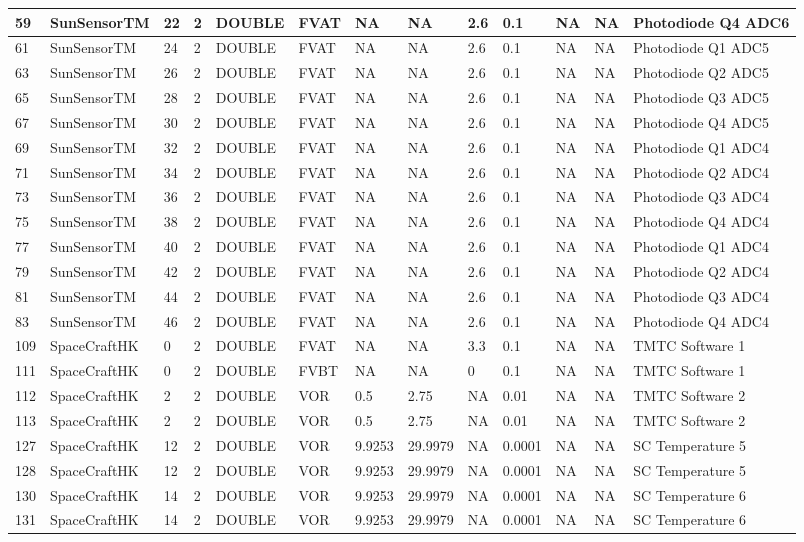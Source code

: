 {\begin{longtable}{|l|l|l|l|l|l|l|l|l|l|l|l|p{}|}
59 & SunSensorTM & 22 & 2 & DOUBLE & FVAT & NA & NA & 2.6 & 0.1 & NA & NA & Photodiode Q4 ADC6 \\ \hline
61 & SunSensorTM & 24 & 2 & DOUBLE & FVAT & NA & NA & 2.6 & 0.1 & NA & NA & Photodiode Q1 ADC5 \\ \hline
63 & SunSensorTM & 26 & 2 & DOUBLE & FVAT & NA & NA & 2.6 & 0.1 & NA & NA & Photodiode Q2 ADC5 \\ \hline
65 & SunSensorTM & 28 & 2 & DOUBLE & FVAT & NA & NA & 2.6 & 0.1 & NA & NA & Photodiode Q3 ADC5 \\ \hline
67 & SunSensorTM & 30 & 2 & DOUBLE & FVAT & NA & NA & 2.6 & 0.1 & NA & NA & Photodiode Q4 ADC5 \\ \hline
69 & SunSensorTM & 32 & 2 & DOUBLE & FVAT & NA & NA & 2.6 & 0.1 & NA & NA & Photodiode Q1 ADC4 \\ \hline
71 & SunSensorTM & 34 & 2 & DOUBLE & FVAT & NA & NA & 2.6 & 0.1 & NA & NA & Photodiode Q2 ADC4 \\ \hline
73 & SunSensorTM & 36 & 2 & DOUBLE & FVAT & NA & NA & 2.6 & 0.1 & NA & NA & Photodiode Q3 ADC4 \\ \hline
75 & SunSensorTM & 38 & 2 & DOUBLE & FVAT & NA & NA & 2.6 & 0.1 & NA & NA & Photodiode Q4 ADC4 \\ \hline
77 & SunSensorTM & 40 & 2 & DOUBLE & FVAT & NA & NA & 2.6 & 0.1 & NA & NA & Photodiode Q1 ADC4 \\ \hline
79 & SunSensorTM & 42 & 2 & DOUBLE & FVAT & NA & NA & 2.6 & 0.1 & NA & NA & Photodiode Q2 ADC4 \\ \hline
81 & SunSensorTM & 44 & 2 & DOUBLE & FVAT & NA & NA & 2.6 & 0.1 & NA & NA & Photodiode Q3 ADC4 \\ \hline
83 & SunSensorTM & 46 & 2 & DOUBLE & FVAT & NA & NA & 2.6 & 0.1 & NA & NA & Photodiode Q4 ADC4 \\ \hline
109 & SpaceCraftHK & 0 & 2 & DOUBLE & FVAT & NA & NA & 3.3 & 0.1 & NA & NA & TMTC Software 1 \\ \hline
111 & SpaceCraftHK & 0 & 2 & DOUBLE & FVBT & NA & NA & 0 & 0.1 & NA & NA & TMTC Software 1 \\ \hline
112 & SpaceCraftHK & 2 & 2 & DOUBLE & VOR & 0.5 & 2.75 & NA & 0.01 & NA & NA & TMTC Software 2 \\ \hline
113 & SpaceCraftHK & 2 & 2 & DOUBLE & VOR & 0.5 & 2.75 & NA & 0.01 & NA & NA & TMTC Software 2 \\ \hline
127 & SpaceCraftHK & 12 & 2 & DOUBLE & VOR & 9.9253 & 29.9979 & NA & 0.0001 & NA & NA & SC Temperature 5 \\ \hline
128 & SpaceCraftHK & 12 & 2 & DOUBLE & VOR & 9.9253 & 29.9979 & NA & 0.0001 & NA & NA & SC Temperature 5 \\ \hline
130 & SpaceCraftHK & 14 & 2 & DOUBLE & VOR & 9.9253 & 29.9979 & NA & 0.0001 & NA & NA & SC Temperature 6 \\ \hline
131 & SpaceCraftHK & 14 & 2 & DOUBLE & VOR & 9.9253 & 29.9979 & NA & 0.0001 & NA & NA & SC Temperature 6 \\ \hline
\end{longtable}}
